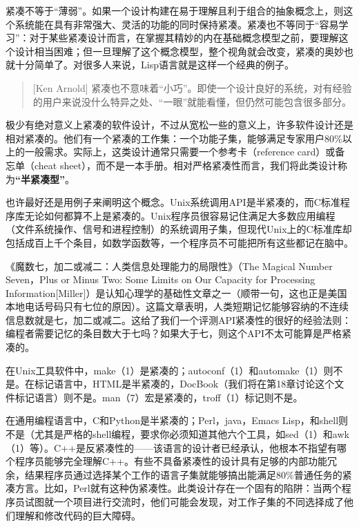 \documentclass[11pt,oneside]{book}
\begin{document}
\begin{common-format}
紧凑不等于“薄弱”。如果一个设计构建在易于理解且利于组合的抽象概念上，则这个系统能在具有非常强大、灵活的功能的同时保持紧凑。紧凑也不等同于“容易学习”：对于某些紧凑设计而言，在掌握其精妙的内在基础概念模型之前，要理解这个设计相当困难；但一旦理解了这个概念模型，整个视角就会改变，紧凑的奥妙也就十分简单了。对很多人来说，Lisp语言就是这样一个经典的例子。

\begin{quote}[Ken Arnold]
紧凑也不意味着“小巧”。即使一个设计良好的系统，对有经验的用户来说没什么特异之处、“一眼”就能看懂，但仍然可能包含很多部分。
\end{quote}

极少有绝对意义上紧凑的软件设计，不过从宽松一些的意义上，许多软件设计还是相对紧凑的。他们有一个紧凑的工作集：一个功能子集，能够满足专家用户80\%以上的一般需求。实际上，这类设计通常只需要一个参考卡（reference card）或备忘单（cheat sheet），而不是一本手册。相对严格紧凑性而言，我们将此类设计称为\textbf{“半紧凑型”}。

也许最好还是用例子来阐明这个概念。Unix系统调用API是半紧凑的，而C标准程序库无论如何都算不上是紧凑的。Unix程序员很容易记住满足大多数应用编程（文件系统操作、信号和进程控制）的系统调用子集，但现代Unix上的C标准库却包括成百上千个条目，如数学函数等，一个程序员不可能把所有这些都记在脑中。

《魔数七，加二或减二：人类信息处理能力的局限性》（The Magical Number Seven，Plus or Minus Two: Some Limits on Our Capacity for Processing Information[Miller]）是认知心理学的基础性文章之一（顺带一句，这也正是美国本地电话号码只有七位的原因）。这篇文章表明，人类短期记忆能够容纳的不连续信息数就是七，加二或减二。这给了我们一个评测API紧凑性的很好的经验法则：编程者需要记忆的条目数大于七吗？如果大于七，则这个API不太可能算是严格紧凑的。

在Unix工具软件中，make（1）是紧凑的；autoconf（1）和automake（1）则不是。在标记语言中，HTML是半紧凑的，DocBook（我们将在第18章讨论这个文件标记语言）则不是。man（7）宏是紧凑的，troff（1）标记则不是。

在通用编程语言中，C和Python是半紧凑的；Perl，java，Emacs Lisp，和shell则不是（尤其是严格的shell编程，要求你必须知道其他六个工具，如sed（1）和awk（1）等）。C++是反紧凑性的——该语言的设计者已经承认，他根本不指望有哪个程序员能够完全理解C++。有些不具备紧凑性的设计具有足够的内部功能冗余，结果程序员通过选择某个工作的语言子集就能够搞出能满足80\%普通任务的紧凑方言。比如，Perl就有这种伪紧凑性。此类设计存在一个固有的陷阱：当两个程序员试图就一个项目进行交流时，他们可能会发现，对工作子集的不同选择成了他们理解和修改代码的巨大障碍。


\end{common-format}
\end{document}
